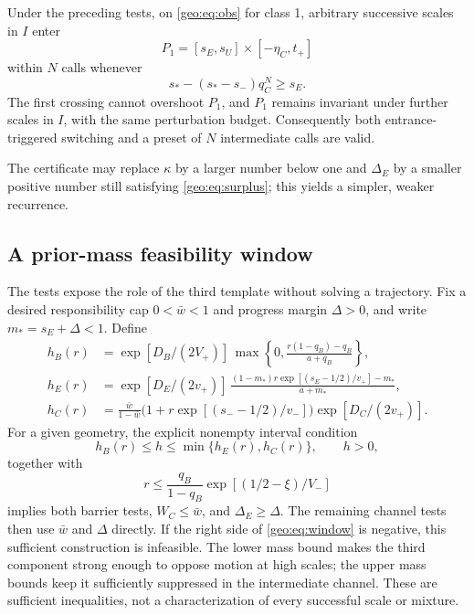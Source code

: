\begin{proposition}\label{geo:prop:channel}
Under the preceding tests, on \eqref{geo:eq:obs} for class 1, arbitrary successive
scales in $I$ enter
\[
 P_1=[s_E,s_U]\times[-\eta_C,t_+]
\]
within $N$ calls whenever
\begin{equation}\label{geo:eq:N}
 s_*-(s_*-s_-)q_C^N\ge s_E.
\end{equation}
The first crossing cannot overshoot $P_1$, and $P_1$ remains invariant under
further scales in $I$, with the same perturbation budget. Consequently both
entrance-triggered switching and a preset of $N$ intermediate calls are valid.
\end{proposition}

The certificate may replace $\kappa$ by a larger number below one and
$\Delta_E$ by a smaller positive number still satisfying
\eqref{geo:eq:surplus}; this yields a simpler, weaker recurrence.

\subsection{A prior-mass feasibility window}
The tests expose the role of the third template without solving a trajectory.
Fix a desired responsibility cap $0<\bar w<1$ and progress margin $\Delta>0$, and
write $m_*=s_E+\Delta<1$. Define
\begin{align}
 h_B(r)&=\exp[D_B/(2V_+)]\,
 \max\left\{0,\frac{r(1-q_B)-q_B}{a+q_B}\right\},\label{geo:eq:hB}\\
 h_E(r)&=\exp[D_E/(2v_+)]\,
 \frac{(1-m_*)r\exp[(s_E-1/2)/v_+]-m_*}{a+m_*},\label{geo:eq:hE}\\
 h_C(r)&=\frac{\bar w}{1-\bar w}
 \bigl(1+r\exp[(s_--1/2)/v_-]\bigr)\exp[D_C/(2v_+)].\label{geo:eq:hC}
\end{align}
For a given geometry, the explicit nonempty interval condition
\begin{equation}\label{geo:eq:window}
 h_B(r)\le h\le\min\{h_E(r),h_C(r)\},\qquad h>0,
\end{equation}
together with
\[
 r\le\frac{q_B}{1-q_B}\exp[(1/2-\xi)/V_-]
\]
implies both barrier tests, $W_C\le\bar w$, and $\Delta_E\ge\Delta$.
The remaining channel tests then use $\bar w$ and $\Delta$ directly. If the
right side of \eqref{geo:eq:window} is negative, this sufficient construction is
infeasible. The lower mass bound makes the third component strong enough to
oppose motion at high scales; the upper mass bounds keep it sufficiently
suppressed in the intermediate channel. These are sufficient inequalities,
not a characterization of every successful scale or mixture.

